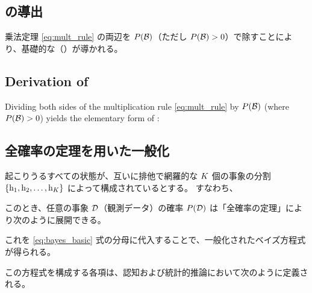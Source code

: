 \ifja
    \subsection{\jaTextBayesTheorem の導出}
    乗法定理 \eqref{eq:mult_rule} の両辺を $P( \mathcal{B} )$（ただし $P( \mathcal{B} ) > 0$）で除すことにより、基礎的な\jaTextBayesTheorem（\fullTextBayesTheorem）が導かれる。
    
\else
    \subsection{Derivation of \fullTextBayesTheorem}
    Dividing both sides of the multiplication rule \eqref{eq:mult_rule} by $P( \mathcal{B} )$ (where $P( \mathcal{B} ) > 0$) yields the elementary form of \fullTextBayesTheorem:
    
\fi

\ifja 
    \subsection{全確率の定理を用いた一般化}
    起こりうるすべての状態が、互いに排他で網羅的な $K$ 個の事象の分割 $\{\mathrm{h}_1, \mathrm{h}_2, \dots, \mathrm{h}_{K}\}$ によって構成されているとする。
    すなわち、

    

    このとき、任意の事象 $\mathcal{D}$（観測データ）の確率 $P( \mathcal{D} )$ は「全確率の定理」により次のように展開できる。

    

    これを \eqref{eq:bayes_basic} 式の分母に代入することで、一般化されたベイズ方程式が得られる。

    

    この方程式を構成する各項は、認知および統計的推論において次のように定義される。


